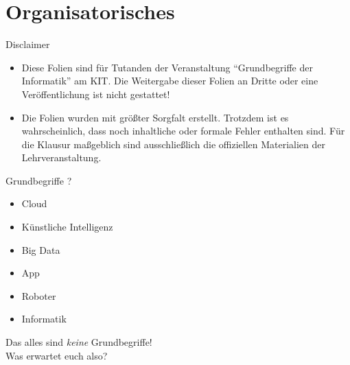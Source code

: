 




\graphicspath{{../figures/}}



\section{Organisatorisches}

\aboutMeFrame

\begin{frame}{Disclaimer}
	\begin{itemize}
		\item Diese Folien sind für Tutanden der Veranstaltung \enquote{Grundbegriffe der Informatik} am KIT. Die Weitergabe dieser Folien an Dritte oder eine Veröffentlichung ist nicht gestattet!
		\item Die Folien wurden mit größter Sorgfalt erstellt. Trotzdem ist es wahrscheinlich, dass noch inhaltliche oder formale Fehler enthalten sind. Für die Klausur maßgeblich sind ausschließlich die offiziellen Materialien der Lehrveranstaltung.
	\end{itemize}
\end{frame}


\begin{frame}{Grundbegriffe ?}
	\begin{itemize}
		\item Cloud
		\item Künstliche Intelligenz
		\item Big Data
		\item App
		\item Roboter
		\item Informatik
	\end{itemize}

	\pause
	Das alles sind \emph{keine} Grundbegriffe!\\
	Was erwartet euch also?
\end{frame}

